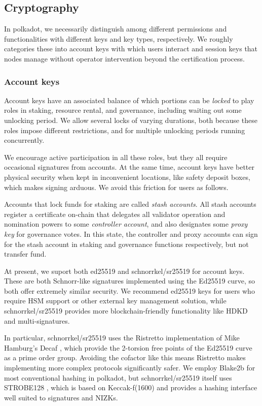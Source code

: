 \subsection{Cryptography}\label{sec:crypto}

In polkadot, we necessarily distinguish among different permissions and functionalities with different keys and key types, respectively.  We roughly categories these into account keys with which users interact and session keys that nodes manage without operator intervention beyond the certification process.

\subsubsection{Account keys}

Account keys have an associated balance of which portions can be {\em locked} to play roles in staking, resource rental, and governance, including waiting out some unlocking period.  We allow several locks of varying durations, both because these roles impose different restrictions, and for multiple unlocking periods running concurrently. 

We encourage active participation in all these roles, but they all require occasional signatures from accounts.  At the same time, account keys have better physical security when kept in inconvenient locations, like safety deposit boxes, which makes signing arduous.  We avoid this friction for users as follows.

Accounts that lock funds for staking are called {\em stash accounts}.  All stash accounts register a certificate on-chain that delegates all validator operation and nomination powers to some {\em controller account}, and also designates some {\em proxy key} for governance votes.  In this state, the controller and proxy accounts can sign for the stash account in staking and governance functions respectively, but not transfer fund.  

\smallskip

At present, we suport both ed25519 and schnorrkel/sr25519 for account keys.  These are both Schnorr-like signatures implemented using the Ed25519 curve, so both offer extremely similar security.  We recommend ed25519 keys for users who require HSM support or other external key management solution, while schnorrkel/sr25519 provides more blockchain-friendly functionality like HDKD and multi-signatures.  

In particular, schnorrkel/sr25519 uses the Ristretto implementation \cite{Ristretto} of Mike Hamburg's Decaf \cite[\S7]{Decaf}, which provide the 2-torsion free points of the Ed25519 curve as a prime order group.  Avoiding the cofactor like this means Ristretto makes implementing more complex protocols significantly safer.  We employ Blake2b for most conventional hashing in polkadot, but schnorrkel/sr25519 itself uses STROBE128 \cite{STROBE}, which is based on Keccak-f(1600) and provides a hashing interface well suited to signatures and NIZKs.

